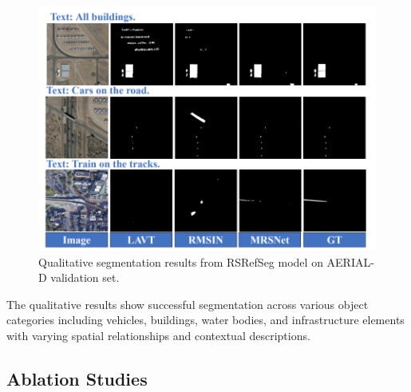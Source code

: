 \begin{figure}[H]
\centering
\includegraphics[width=\textwidth]{./Images/qualitative.png}
\caption{Qualitative segmentation results from RSRefSeg model on AERIAL-D validation set.}
\label{fig:qualitative_examples}
\end{figure}

The qualitative results show successful segmentation across various object categories including vehicles, buildings, water bodies, and infrastructure elements with varying spatial relationships and contextual descriptions.

\subsection{Ablation Studies}

\begin{table}[H]
\centering
\caption{Ablation Study: Expression Type Training Analysis}
\label{tab:ablation_expression_types}
\end{table}

